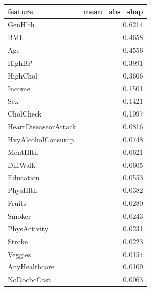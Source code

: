 \begin{tabular}{lr}
\toprule
feature & mean\_abs\_shap \\
\midrule
GenHlth & 0.6214 \\
BMI & 0.4658 \\
Age & 0.4556 \\
HighBP & 0.3991 \\
HighChol & 0.3606 \\
Income & 0.1501 \\
Sex & 0.1421 \\
CholCheck & 0.1097 \\
HeartDiseaseorAttack & 0.0816 \\
HvyAlcoholConsump & 0.0748 \\
MentHlth & 0.0621 \\
DiffWalk & 0.0605 \\
Education & 0.0553 \\
PhysHlth & 0.0382 \\
Fruits & 0.0280 \\
Smoker & 0.0243 \\
PhysActivity & 0.0231 \\
Stroke & 0.0223 \\
Veggies & 0.0154 \\
AnyHealthcare & 0.0109 \\
NoDocbcCost & 0.0063 \\
\bottomrule
\end{tabular}
